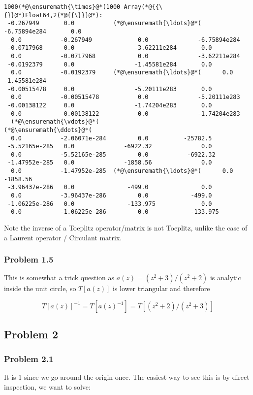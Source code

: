 \documentclass[12pt,landscape]{article}
\begin{document}
{\begin{lstlisting}
1000(*@\ensuremath{\times}@*(1000 Array(*@{{\{}}@*)Float64,2(*@{{\}}}@*):
 -0.267949       0.0           (*@\ensuremath{\ldots}@*(     -6.75894e284       0.0
  0.0           -0.267949             0.0              -6.75894e284
 -0.0717968      0.0                 -3.62211e284       0.0
  0.0           -0.0717968            0.0              -3.62211e284
 -0.0192379      0.0                 -1.45581e284       0.0
  0.0           -0.0192379     (*@\ensuremath{\ldots}@*(      0.0              -1.45581e284
 -0.00515478     0.0                 -5.20111e283       0.0
  0.0           -0.00515478           0.0              -5.20111e283
 -0.00138122     0.0                 -1.74204e283       0.0
  0.0           -0.00138122           0.0              -1.74204e283
  (*@\ensuremath{\vdots}@*(                            (*@\ensuremath{\ddots}@*(                   
  0.0           -2.06071e-284         0.0          -25782.5
 -5.52165e-285   0.0              -6922.32              0.0
  0.0           -5.52165e-285         0.0           -6922.32
 -1.47952e-285   0.0              -1858.56              0.0
  0.0           -1.47952e-285  (*@\ensuremath{\ldots}@*(      0.0           -1858.56
 -3.96437e-286   0.0               -499.0               0.0
  0.0           -3.96437e-286         0.0            -499.0
 -1.06225e-286   0.0               -133.975             0.0
  0.0           -1.06225e-286         0.0            -133.975
\end{lstlisting}


Note the inverse of a Toeplitz operator/matrix is not Toeplitz, unlike the case of a Laurent operator / Circulant matrix.

\subsubsection{Problem 1.5}
This is somewhat a trick question as $a(z) = (z^2 + 3)/ (z^2 + 2)$ is analytic inside the unit circle, so $T[a(z)]$ is lower triangular and  therefore

\[
T[a(z)]^{-1} = T[a(z)^{-1}] = T[(z^2 + 2)/(z^2+3)]
\]
\subsection{Problem 2}
\subsubsection{Problem 2.1}
It is 1 since we go around the origin once. The easiest way to see this is by direct inspection, we want to solve:

}
\end{document}
